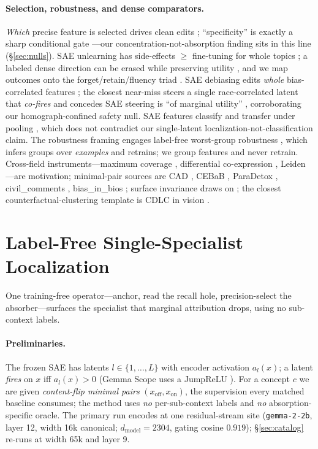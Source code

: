 \documentclass[11pt,letterpaper]{article}
\begin{document}
\paragraph{Selection, robustness, and dense comparators.} \emph{Which} precise feature is selected drives clean edits \citep{Arad2025, Chalnev2024, Duan2026}; ``specificity'' is exactly a sharp conditional gate \citep{Templeton2024}---our concentration-not-absorption finding sits in this line (\S\ref{sec:nulls}). SAE unlearning has side-effects $\ge$ fine-tuning for whole topics \citep{Farrell2024}; a labeled dense direction can be erased while preserving utility \citep{Belrose2023, KarvonenMarks2025, He2025, Ashuach2025}, and we map outcomes onto the forget/retain/fluency triad \citep{Li2024, Shi2024}. SAE debiasing edits \emph{whole} bias-correlated features \citep{Sasse2024, Xu2025}; the closest near-miss steers a single race-correlated latent that \emph{co-fires} and concedes SAE steering is ``of marginal utility'' \citep{Ahsan2025}, corroborating our homograph-confined safety null. SAE features classify and transfer under pooling \citep{Gallifant2025}, which does not contradict our single-latent localization-not-classification claim. The robustness framing engages label-free worst-group robustness \citep{Sagawa2019, Liu2021, Sohoni2020, Creager2020, Nam2020, Rudner2024}, which infers groups over \emph{examples} and retrains; we group features and never retrain. Cross-field instruments---maximum coverage \citep{Nemhauser1978, Feige1998}, differential co-expression \citep{Tesson2010, Zhang2005}, Leiden \citep{Traag2018}---are motivation; minimal-pair sources are CAD \citep{Kaushik2019}, CEBaB \citep{Abraham2022}, ParaDetox \citep{Logacheva2022}, civil\_comments \citep{Borkan2019}, bias\_in\_bios \citep{DeArteaga2019}; surface invariance draws on \citep{Belrose2023, Veitch2021}; the closest counterfactual-clustering template is CDLC in vision \citep{Varshney2025}.

\section{Label-Free Single-Specialist Localization}
\label{sec:method}

One training-free operator---anchor, read the recall hole, precision-select the absorber---surfaces the specialist that marginal attribution drops, using no sub-context labels.

\paragraph{Preliminaries.} The frozen SAE has latents $l\in\{1,\dots,L\}$ with encoder activation $a_l(x)$; a latent \emph{fires} on $x$ iff $a_l(x)>0$ (Gemma Scope uses a JumpReLU \citep{Lieberum2024}). For a concept $c$ we are given \emph{content-flip minimal pairs} $(x_{\text{off}},x_{\text{on}})$, the supervision every matched baseline consumes; the method uses \emph{no} per-sub-context labels and \emph{no} absorption-specific oracle. The primary run encodes at one residual-stream site (\texttt{gemma-2-2b}, layer 12, width 16k canonical; $d_{\text{model}}=2304$, gating cosine $0.919$); \S\ref{sec:catalog} re-runs at width 65k and layer 9.
\end{document}
